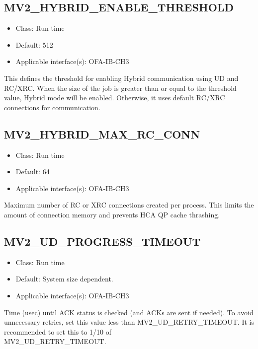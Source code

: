 \subsection{MV2\_HYBRID\_ENABLE\_THRESHOLD}
\label{def:ud-hybrid-threshold}

\begin{itemize}
        \item Class: Run time
        \item Default: 512
        \item Applicable interface(s): OFA-IB-CH3
\end{itemize}
This defines the threshold for enabling Hybrid communication
using UD and RC/XRC. When the size of the job is greater 
than or equal to the threshold value, Hybrid mode will be
enabled. Otherwise, it uses default RC/XRC connections for
communication.

\subsection{MV2\_HYBRID\_MAX\_RC\_CONN}
\label{def:max-rc-conn}

\begin{itemize}
        \item Class: Run time
        \item Default: 64
        \item Applicable interface(s): OFA-IB-CH3
\end{itemize}
Maximum number of RC or XRC connections created per process. This limits the 
amount of connection memory and prevents HCA QP cache thrashing.

\subsection{MV2\_UD\_PROGRESS\_TIMEOUT}
\label{def:ud-progress-timeout}

\begin{itemize}
        \item Class: Run time
        \item Default: System size dependent.
        \item Applicable interface(s): OFA-IB-CH3
\end{itemize}

Time (usec) until ACK status is checked (and ACKs are sent if needed). 
To avoid unnecessary retries, set this value less than MV2\_UD\_RETRY\_TIMEOUT.
It is recommended to set this to 1/10 of \\
MV2\_UD\_RETRY\_TIMEOUT.


